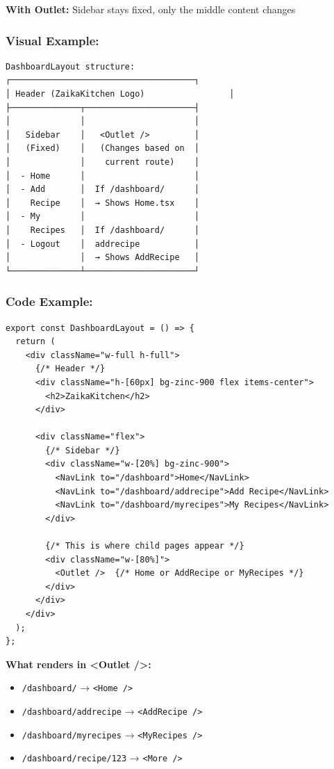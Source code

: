 \documentclass[12pt]{article}
\begin{document}
\textbf{With Outlet:} Sidebar stays fixed, only the middle content changes

\subsubsection*{Visual Example:}

\begin{lstlisting}
DashboardLayout structure:
┌─────────────────────────────────────┐
│ Header (ZaikaKitchen Logo)                 │
├──────────────┬──────────────────────┤
│              │                      │
│   Sidebar    │   <Outlet />         │
│   (Fixed)    │   (Changes based on  │
│              │    current route)    │
│  - Home      │                      │
│  - Add       │  If /dashboard/      │
│    Recipe    │  → Shows Home.tsx    │
│  - My        │                      │
│    Recipes   │  If /dashboard/      │
│  - Logout    │  addrecipe           │
│              │  → Shows AddRecipe   │
└──────────────┴──────────────────────┘
\end{lstlisting}

\subsubsection*{Code Example:}

\begin{lstlisting}
export const DashboardLayout = () => {
  return (
    <div className="w-full h-full">
      {/* Header */}
      <div className="h-[60px] bg-zinc-900 flex items-center">
        <h2>ZaikaKitchen</h2>
      </div>
      
      <div className="flex">
        {/* Sidebar */}
        <div className="w-[20%] bg-zinc-900">
          <NavLink to="/dashboard">Home</NavLink>
          <NavLink to="/dashboard/addrecipe">Add Recipe</NavLink>
          <NavLink to="/dashboard/myrecipes">My Recipes</NavLink>
        </div>
        
        {/* This is where child pages appear */}
        <div className="w-[80%]">
          <Outlet />  {/* Home or AddRecipe or MyRecipes */}
        </div>
      </div>
    </div>
  );
};
\end{lstlisting}

\textbf{What renders in <Outlet />:}

\begin{itemize}
    \item \texttt{/dashboard/} → \texttt{<Home />}
    \item \texttt{/dashboard/addrecipe} → \texttt{<AddRecipe />}
    \item \texttt{/dashboard/myrecipes} → \texttt{<MyRecipes />}
    \item \texttt{/dashboard/recipe/123} → \texttt{<More />}
\end{itemize}
\end{document}
